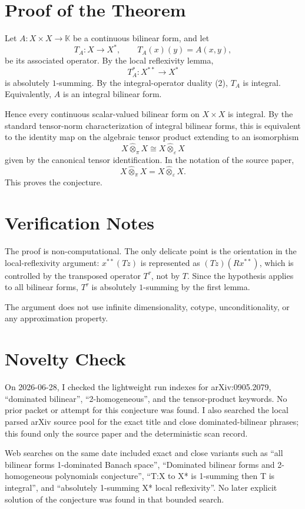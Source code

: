 \documentclass[11pt]{article}
\begin{document}
\section*{Proof of the Theorem}

Let \(A:X\times X\to\mathbb K\) be a continuous bilinear form, and let
\[
  T_A:X\to X^*,\qquad T_A(x)(y)=A(x,y),
\]
be its associated operator. By the local reflexivity lemma,
\[
  T_A^*:X^{**}\to X^*
\]
is absolutely \(1\)-summing. By the integral-operator duality (2), \(T_A\) is
integral. Equivalently, \(A\) is an integral bilinear form.

Hence every continuous scalar-valued bilinear form on \(X\times X\) is
integral. By the standard tensor-norm characterization of integral bilinear
forms, this is equivalent to the identity map on the algebraic tensor product
extending to an isomorphism
\[
  X\widehat\otimes_\pi X \cong X\widehat\otimes_\varepsilon X
\]
given by the canonical tensor identification. In the notation of the source
paper,
\[
  X\widehat\otimes_\pi X=X\widehat\otimes_\varepsilon X .
\]
This proves the conjecture.

\section*{Verification Notes}

The proof is non-computational. The only delicate point is the orientation in
the local-reflexivity argument: \(x^{**}(Tz)\) is represented as
\((Tz)(Rx^{**})\), which is controlled by the transposed operator
\(T^\tau\), not by \(T\). Since the hypothesis applies to all bilinear forms,
\(T^\tau\) is absolutely \(1\)-summing by the first lemma.

The argument does not use infinite dimensionality, cotype, unconditionality, or
any approximation property.

\section*{Novelty Check}

On 2026-06-28, I checked the lightweight run indexes for arXiv:0905.2079,
``dominated bilinear'', ``2-homogeneous'', and the tensor-product keywords.
No prior packet or attempt for this conjecture was found. I also searched the
local parsed arXiv source pool for the exact title and close dominated-bilinear
phrases; this found only the source paper and the deterministic scan record.

Web searches on the same date included exact and close variants such as
``all bilinear forms 1-dominated Banach space'', ``Dominated bilinear forms and
2-homogeneous polynomials conjecture'', ``T:X to X* is 1-summing then T is
integral'', and ``absolutely 1-summing X* local reflexivity''. No later explicit
solution of the conjecture was found in that bounded search.
\end{document}
